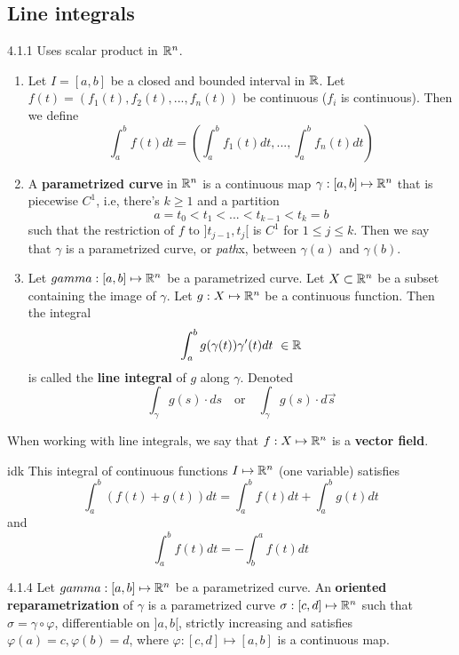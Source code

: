 \subsection{Line integrals}
\begin{definition}{4.1.1}
    Uses scalar product in $\mathbb{R}^n$.

    \begin{enumerate}
        \item Let $I = [a,b]$ be a closed and bounded interval in $\mathbb{R}$. Let $f(t) = (f_1(t), f_2(t), ..., f_n(t))$
              be continuous ($f_i$ is continuous). Then we define
              \[ \int_a^b f(t) dt = \left( \int_a^b f_1(t) dt, ..., \int_a^b f_n(t) dt \right) \]
        \item A \textbf{parametrized curve} in $\mathbb{R}^n$ is a continuous map $\gamma: [a,b] \mapsto \mathbb{R}^n$ that is piecewise $C^1$, i.e,
              there's $k \ge 1$ and a partition
              \[ a = t_0 < t_1 < ... < t_{k-1} < t_k = b \]
              such that the restriction of $f$ to $]t_{j-1}, t_j[$ is $C^1$ for $1 \le j \le k$. Then we say that $\gamma$ is a parametrized
              curve, or \textit{path}x, between $\gamma(a)$ and $\gamma(b)$.
        \item Let $gamma: [a,b] \mapsto \mathbb{R}^n$ be a parametrized curve. Let $X \subset \mathbb{R}^n$ be a subset containing the image of $\gamma$.
              Let $g: X \mapsto \mathbb{R}^n$ be a continuous function. Then the integral
              \[ \int_a^b g(\gamma(t))\gamma'(t) dt\ \in \mathbb{R} \]
              is called the \textbf{line integral} of $g$ along $\gamma$. Denoted
              \[ \int_\gamma g(s)\cdot ds \quad \mbox{or} \quad \int_\gamma g(s) \cdot d\vec{s}\]
    \end{enumerate}
\end{definition}

When working with line integrals, we say that $f: X \mapsto \mathbb{R}^n$ is a \textbf{vector field}.

\begin{proposition}{idk}
    This integral  of continuous functions $I \mapsto \mathbb{R}^n$ (one variable) satisfies
    \[ \int_a^b (f(t) + g(t))dt = \int_a^b f(t) dt + \int_a^b g(t)dt \]
    and
    \[ \int_a^b f(t)dt = - \int_b^a f(t)dt \]
\end{proposition}

\begin{definition}{4.1.4}
    Let $gamma: [a,b] \mapsto \mathbb{R}^n$ be a parametrized curve. An \textbf{oriented reparametrization} of $\gamma$ is
    a parametrized curve $\sigma: [c,d] \mapsto \mathbb{R}^n$ such that $\sigma = \gamma \circ \varphi$, differentiable on $]a,b[$, strictly
    increasing and satisfies $\varphi(a) = c, \varphi(b) = d$, where $\varphi: [c,d] \mapsto [a,b]$ is a continuous map.
\end{definition}

